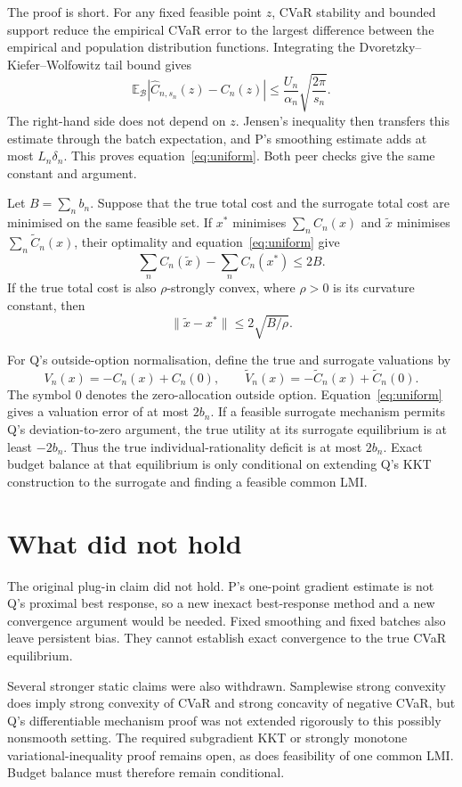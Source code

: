 \documentclass{article}
\begin{document}
The proof is short.  For any fixed feasible point $z$, CVaR stability and bounded support reduce the empirical CVaR error to the largest difference between the empirical and population distribution functions.  Integrating the Dvoretzky--Kiefer--Wolfowitz tail bound gives
\[
 \mathbb{E}_{\mathcal B}
 |\widehat C_{n,s_n}(z)-C_n(z)|
 \leq \frac{U_n}{\alpha_n}\sqrt{\frac{2\pi}{s_n}}.
\]
The right-hand side does not depend on $z$.  Jensen's inequality then transfers this estimate through the batch expectation, and P's smoothing estimate adds at most $L_n\delta_n$.  This proves equation~\eqref{eq:uniform}.  Both peer checks give the same constant and argument.

Let $B=\sum_n b_n$.  Suppose that the true total cost and the surrogate total cost are minimised on the same feasible set.  If $x^*$ minimises $\sum_n C_n(x)$ and $\widetilde x$ minimises $\sum_n\widetilde C_n(x)$, their optimality and equation~\eqref{eq:uniform} give
\[
 \sum_n C_n(\widetilde x)-\sum_n C_n(x^*)\leq 2B.
\]
If the true total cost is also $\rho$-strongly convex, where $\rho>0$ is its curvature constant, then
\[
 \|\widetilde x-x^*\|\leq 2\sqrt{B/\rho}.
\]

For Q's outside-option normalisation, define the true and surrogate valuations by
\[
 V_n(x)=-C_n(x)+C_n(0),\qquad
 \widetilde V_n(x)=-\widetilde C_n(x)+\widetilde C_n(0).
\]
The symbol $0$ denotes the zero-allocation outside option.  Equation~\eqref{eq:uniform} gives a valuation error of at most $2b_n$.  If a feasible surrogate mechanism permits Q's deviation-to-zero argument, the true utility at its surrogate equilibrium is at least $-2b_n$.  Thus the true individual-rationality deficit is at most $2b_n$.  Exact budget balance at that equilibrium is only conditional on extending Q's KKT construction to the surrogate and finding a feasible common LMI.

\section{What did not hold}

The original plug-in claim did not hold.  P's one-point gradient estimate is not Q's proximal best response, so a new inexact best-response method and a new convergence argument would be needed.  Fixed smoothing and fixed batches also leave persistent bias.  They cannot establish exact convergence to the true CVaR equilibrium.

Several stronger static claims were also withdrawn.  Samplewise strong convexity does imply strong convexity of CVaR and strong concavity of negative CVaR, but Q's differentiable mechanism proof was not extended rigorously to this possibly nonsmooth setting.  The required subgradient KKT or strongly monotone variational-inequality proof remains open, as does feasibility of one common LMI.  Budget balance must therefore remain conditional.
\end{document}
